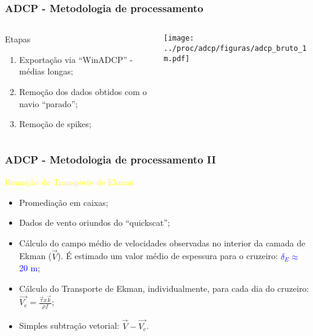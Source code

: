 \documentclass[pdftex]{beamer}
\begin{document}
\frame
{
  \frametitle{ADCP - Metodologia de processamento}
\vspace{0.5cm}
\begin{columns}
  \begin{column}{6cm}
    \begin{block}{Etapas}
    \begin{enumerate}
      \item Exportação via ``WinADCP'' - médias longas;
\vspace{0.5cm}
      \item Remoção dos dados obtidos com o navio ``parado'';
\vspace{0.5cm}
      \item Remoção de spikes;
    \end{enumerate}
    \end{block}
  \end{column}
  \begin{column}{5cm}
    \vspace{-1cm}
    \begin{center}
    \texttt{[image: ../proc/adcp/figuras/adcp\_bruto\_1m.pdf]}
    \end{center}
  \end{column}
\end{columns} 
}

\frame
{
  \frametitle{ADCP - Metodologia de processamento II}

\begin{block}{\textcolor{yellow}{Remoção do Transporte de Ekman}}
{\small
    \begin{itemize}
      \item Promediação em caixas;
\vspace{0.2cm}
      \item Dados de vento oriundos do ``quickscat'';
\vspace{0.2cm}
      \item Cálculo do campo médio de velocidades observadas no interior da camada de Ekman ($\vec{V}$). É estimado um valor médio de espessura para o cruzeiro: \textcolor{blue}{$\delta_E \approx$  20 m};
\vspace{0.2cm}
      \item Cálculo do Transporte de Ekman, individualmente, para cada dia do cruzeiro: $\vec{V_e} = \frac{\vec{\tau} x \vec{k}}{\rho f}$;
\vspace{0.2cm}
      \item Simples subtração vetorial: $\vec{V} - \vec{V_e}$.
    \end{itemize}
}
\end{block}
}
\end{document}
